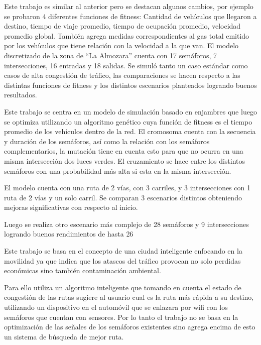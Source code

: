 \begin{itemize}
	\begin{item}
		Este trabajo es similar al anterior pero se destacan algunos cambios, por ejemplo se probaron 4 diferentes funciones de fitness: Cantidad de vehículos que llegaron a destino, tiempo de viaje promedio, tiempo de ocupación promedio, velocidad promedio global.
		También agrega medidas correspondientes al gas total emitido por los vehículos que tiene relación con la velocidad a la que van.
		El modelo discretizado de la zona de “La Almozara” cuenta con 17 semáforos, 7 intersecciones, 16 entradas y 18 salidas.
		Se simuló tanto un caso estándar como casos de alta congestión de tráfico, las comparaciones se hacen respecto a las distintas funciones de fitness y los distintos escenarios planteados logrando buenos resultados.
		
	\end{item}
	
	
	\begin{item}
		\bibentry{Penner2002}
		Este trabajo se centra en un modelo de simulación basado en enjambres que luego se optimiza utilizando un algoritmo genético cuya función de fitness es el tiempo promedio de los vehículos dentro de la red. El cromosoma cuenta con la secuencia y duración de los semáforos, así como la relación con los semáforos complementarios, la mutación tiene en cuenta esto para que no ocurra en una misma intersección dos luces verdes. El cruzamiento se hace entre los distintos semáforos con una probabilidad más alta si esta en la misma intersección.
		
		El modelo cuenta con una ruta de 2 vías, con 3 carriles, y 3 intersecciones con 1 ruta de 2 vías y un solo carril.
		Se comparan 3 escenarios distintos obteniendo mejoras significativas con respecto al inicio.
		
		Luego se realiza otro escenario más complejo de 28 semáforos  y 9 intersecciones logrando buenos rendimientos de hasta 26%
	\end{item}	
	
	
	\begin{item}
		\bibentry{Stolfi2012}
		Este trabajo se basa en el concepto de una ciudad inteligente enfocando en la movilidad ya que indica que los atascos del tráfico provocan no solo perdidas económicas sino también contaminación ambiental.
		
		Para ello utiliza un algoritmo inteligente que tomando en cuenta el estado de congestión de las rutas sugiere al usuario cual es la ruta más rápida a su destino, utilizando un dispositivo en el automóvil que se enlazara por wifi con los semáforos que cuentan con sensores. Por lo tanto el trabajo no se basa en la optimización de las señales de los semáforos existentes sino agrega encima de esto un sistema de búsqueda de mejor ruta.
		

\end{item}
\end{itemize}
